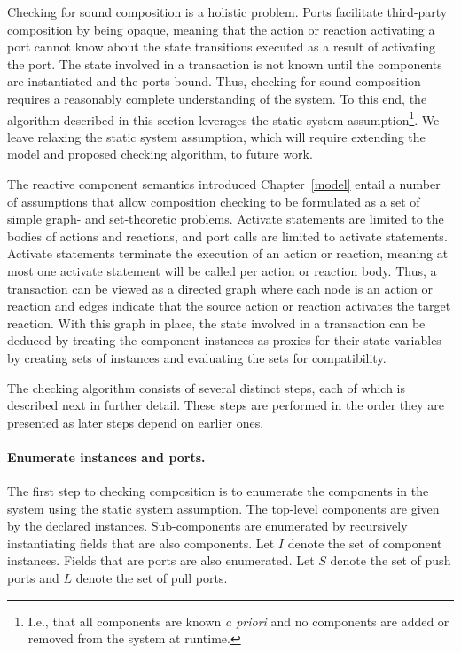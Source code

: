 Checking for sound composition is a holistic problem.
Ports facilitate third-party composition by being opaque, meaning that the action or reaction activating a port cannot know about the state transitions executed as a result of activating the port.
The state involved in a transaction is not known until the components are instantiated and the ports bound.
Thus, checking for sound composition requires a reasonably complete understanding of the system.
To this end, the algorithm described in this section leverages the static system assumption\footnote{I.e., that all components are known \emph{a priori} and no components are added or removed from the system at runtime.}.
We leave relaxing the static system assumption, which will require extending the model and proposed checking algorithm, to future work.

The reactive component semantics introduced Chapter~\ref{model} entail a number of assumptions that allow composition checking to be formulated as a set of simple graph- and set-theoretic problems.
Activate statements are limited to the bodies of actions and reactions, and port calls are limited to activate statements.
Activate statements terminate the execution of an action or reaction, meaning at most one activate statement will be called per action or reaction body.
Thus, a transaction can be viewed as a directed graph where each node is an action or reaction and edges indicate that the source action or reaction activates the target reaction.
With this graph in place, the state involved in a transaction can be deduced by treating the component instances as proxies for their state variables by creating sets of instances and evaluating the sets for compatibility.

The checking algorithm consists of several distinct steps, each of which is described next in further detail.
These steps are performed in the order they are presented as later steps depend on earlier ones.

\paragraph{Enumerate instances and ports.}
The first step to checking composition is to enumerate the components in the system using the static system assumption.
The top-level components are given by the declared instances.
Sub-components are enumerated by recursively instantiating fields that are also components.
Let $I$ denote the set of component instances.
Fields that are ports are also enumerated.
Let $S$ denote the set of push ports and $L$ denote the set of pull ports.

